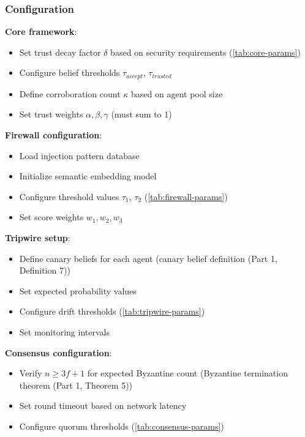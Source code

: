 \documentclass[
]{article}
\begin{document}
\subsubsection{Configuration}\label{sec:config-checklist}

\textbf{Core framework}:

\begin{itemize}
\item Set trust decay factor $\delta$ based on security requirements (\cref{tab:core-params})
\item Configure belief thresholds $\tau_{accept}$, $\tau_{trusted}$
\item Define corroboration count $\kappa$ based on agent pool size
\item Set trust weights $\alpha, \beta, \gamma$ (must sum to 1)
\end{itemize}

\textbf{Firewall configuration}:

\begin{itemize}
\item Load injection pattern database
\item Initialize semantic embedding model
\item Configure threshold values $\tau_1$, $\tau_2$ (\cref{tab:firewall-params})
\item Set score weights $w_1, w_2, w_3$
\end{itemize}

\textbf{Tripwire setup}:

\begin{itemize}
\item Define canary beliefs for each agent (canary belief definition (Part 1, Definition 7))
\item Set expected probability values
\item Configure drift thresholds (\cref{tab:tripwire-params})
\item Set monitoring intervals
\end{itemize}

\textbf{Consensus configuration}:

\begin{itemize}
\item Verify $n \geq 3f + 1$ for expected Byzantine count (Byzantine termination theorem (Part 1, Theorem 5))
\item Set round timeout based on network latency
\item Configure quorum thresholds (\cref{tab:consensus-params})
\end{itemize}
\end{document}
